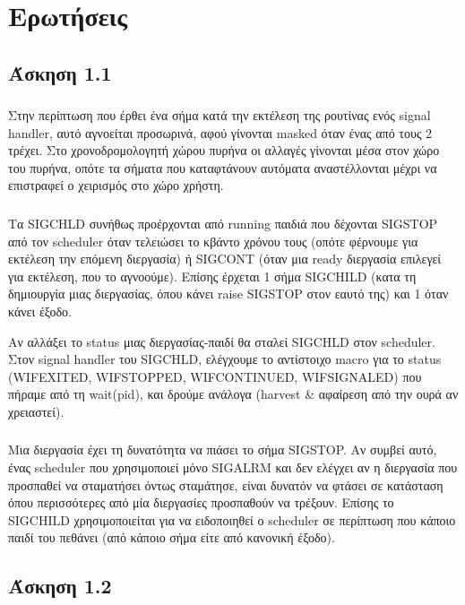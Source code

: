 \documentclass[a4paper,10pt]{article} \usepackage{anysize}
\begin{document}
\renewcommand{\theenumi}{\roman{enumi}}

\section*{Ερωτήσεις}
\setcounter{section}{3}
\subsection{Άσκηση 1.1}
\subsubsection{}
Στην περίπτωση που έρθει ένα σήμα κατά την εκτέλεση της ρουτίνας ενός signal
handler, αυτό αγνοείται προσωρινά, αφού γίνονται masked όταν ένας από τους 2
τρέχει. Στο χρονοδρομολογητή χώρου πυρήνα οι αλλαγές γίνονται μέσα στον χώρο
του πυρήνα, οπότε τα σήματα που καταφτάνουν αυτόματα αναστέλλονται μέχρι να
επιστραφεί ο χειρισμός στο χώρο χρήστη.
\subsubsection{}
Τα SIGCHLD συνήθως προέρχονται από running παιδιά που δέχονται SIGSTOP από τον
scheduler όταν τελειώσει το κβάντο χρόνου τους (οπότε φέρνουμε για εκτέλεση
την επόμενη διεργασία) ή SIGCONT (όταν μια ready διεργασία επιλεγεί για
εκτέλεση, που το αγνοούμε). Επίσης έρχεται 1 σήμα SIGCHILD (κατα τη δημιουργία
μιας διεργασίας, όπου κάνει raise SIGSTOP στον εαυτό της) και 1 όταν κάνει
έξοδο.

Αν αλλάξει το status μιας διεργασίας-παιδί θα σταλεί SIGCHLD στον scheduler.
Στον signal handler του SIGCHLD, ελέγχουμε το αντίστοιχο macro για το
status (WIFEXITED, WIFSTOPPED, WIFCONTINUED, WIFSIGNALED) που πήραμε από τη
wait(pid), και δρούμε ανάλογα (harvest \& αφαίρεση από την ουρά αν χρειαστεί).
\subsubsection{}
Μια διεργασία έχει τη δυνατότητα να πιάσει το σήμα SIGSTΟP. Αν συμβεί αυτό,
ένας scheduler που χρησιμοποιεί μόνο SIGALRM και δεν ελέγχει αν η διεργασία
που προσπαθεί να σταματήσει όντως σταμάτησε, είναι δυνατόν να φτάσει σε
κατάσταση όπου περισσότερες από μία διεργασίες προσπαθούν να τρέξουν. Επίσης
το SIGCHILD χρησιμοποιείται για να ειδοποιηθεί ο scheduler σε περίπτωση που
κάποιο παιδί του πεθάνει (από κάποιο σήμα είτε από κανονική έξοδο).

\subsection{Άσκηση 1.2}
\end{document}
